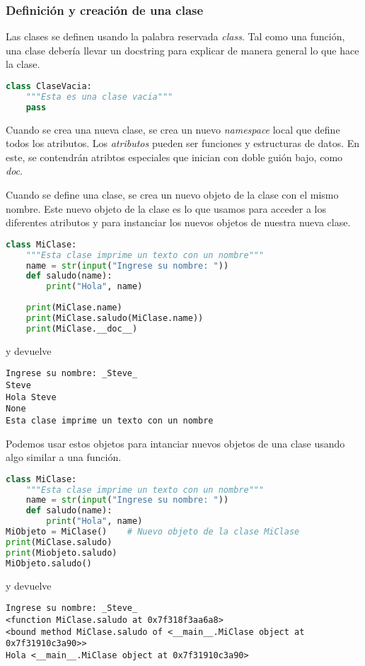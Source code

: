	\subsubsection{Definición y creación de una clase}
	Las clases se definen usando la palabra reservada \emph{class}. Tal como una función, una clase debería llevar un docstring para explicar de manera general lo que hace la clase. 
	\begin{lstlisting}[language = {python}]
class ClaseVacia:
    """Esta es una clase vacia"""
    pass
	\end{lstlisting}
	Cuando se crea una nueva clase, se crea un nuevo \emph{namespace} local que define todos los atributos. Los \emph{atributos} pueden ser funciones y estructuras de datos. En este, se contendrán atribtos especiales que inician con doble guión bajo, como \emph{\textunderscore\textunderscore doc\textunderscore\textunderscore}.\par 
	Cuando se define una clase, se crea un nuevo objeto de la clase con el mismo nombre. Este nuevo objeto de la clase es lo que usamos para acceder a los diferentes atributos y para instanciar los nuevos objetos de nuestra nueva clase.
	\begin{lstlisting}[language = {python}]
class MiClase:
    """Esta clase imprime un texto con un nombre"""
    name = str(input("Ingrese su nombre: "))
    def saludo(name):
        print("Hola", name)
        
    print(MiClase.name)
    print(MiClase.saludo(MiClase.name))
    print(MiClase.__doc__)
	\end{lstlisting}
	y devuelve
	\begin{lstlisting}[language = {[latex]tex}]
Ingrese su nombre: _Steve_
Steve
Hola Steve
None
Esta clase imprime un texto con un nombre
	\end{lstlisting}
	Podemos usar estos objetos para intanciar nuevos objetos de una clase usando algo similar a una función.
	\begin{lstlisting}[language = {python}]
class MiClase:
    """Esta clase imprime un texto con un nombre"""
    name = str(input("Ingrese su nombre: "))
    def saludo(name):
        print("Hola", name)
MiObjeto = MiClase()    # Nuevo objeto de la clase MiClase
print(MiClase.saludo)
print(Miobjeto.saludo)
MiObjeto.saludo()
	\end{lstlisting}
	y devuelve
	\begin{lstlisting}[language = {[latex]tex}]
Ingrese su nombre: _Steve_
<function MiClase.saludo at 0x7f318f3aa6a8>
<bound method MiClase.saludo of <__main__.MiClase object at 0x7f31910c3a90>>
Hola <__main__.MiClase object at 0x7f31910c3a90>
	\end{lstlisting}
